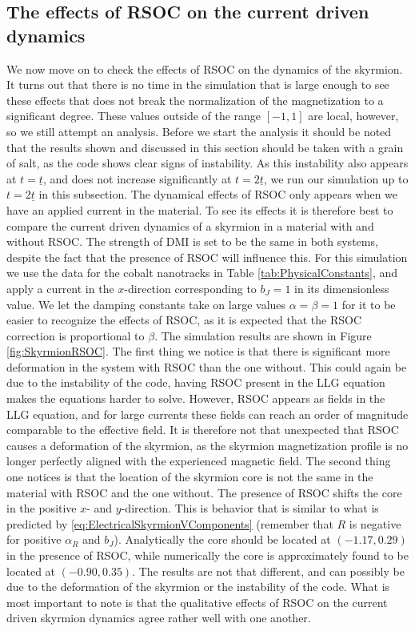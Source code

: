 \subsection{The effects of RSOC on the current driven dynamics}
We now move on to check the effects of RSOC on the dynamics of the skyrmion. It turns out that there is no time in the simulation that is large enough to see these effects that does not break the normalization of the magnetization to a significant degree. These values outside of the range $\left[-1,1\right]$ are local, however, so we still attempt an analysis. Before we start the analysis it should be noted that the results shown and discussed in this section should be taken with a grain of salt, as the code shows clear signs of instability. As this instability also appears at $t=\underline{t}$, and does not increase significantly at $t=2\underline{t}$, we run our simulation up to $t=2\underline{t}$ in this subsection. The dynamical effects of RSOC only appears when we have an applied current in the material. To see its effects it is therefore best to compare the current driven dynamics of a skyrmion in a material with and without RSOC. The strength of DMI is set to be the same in both systems, despite the fact that the presence of RSOC will influence this. For this simulation we use the data for the cobalt nanotracks in Table \ref{tab:PhysicalConstants}, and apply a current in the $x$-direction corresponding to $b_J = 1$ in its dimensionless value. We let the damping constants take on large values $\alpha=\beta=1$ for it to be easier to recognize the effects of RSOC, as it is expected that the RSOC correction is proportional to $\beta$. The simulation results are shown in Figure \ref{fig:SkyrmionRSOC}. The first thing we notice is that there is significant more deformation in the system with RSOC than the one without. This could again be due to the instability of the code, having RSOC present in the LLG equation makes the equations harder to solve. However, RSOC appears as fields in the LLG equation, and for large currents these fields can reach an order of magnitude comparable to the effective field. It is therefore not that unexpected that RSOC causes a deformation of the skyrmion, as the skyrmion magnetization profile is no longer perfectly aligned with the experienced magnetic field. The second thing one notices is that the location of the skyrmion core is not the same in the material with RSOC and the one without. The presence of RSOC shifts the core in the positive $x$- and $y$-direction. This is behavior that is similar to what is predicted by \eqref{eq:ElectricalSkyrmionVComponents} (remember that $R$ is negative for positive $\alpha_R$ and $b_J$). Analytically the core should be located at $\left(-1.17, 0.29\right)$ in the presence of RSOC, while numerically the core is approximately found to be located at $\left(-0.90, 0.35\right)$. The results are not that different, and can possibly be due to the deformation of the skyrmion or the instability of the code. What is most important to note is that the qualitative effects of RSOC on the current driven skyrmion dynamics agree rather well with one another.
